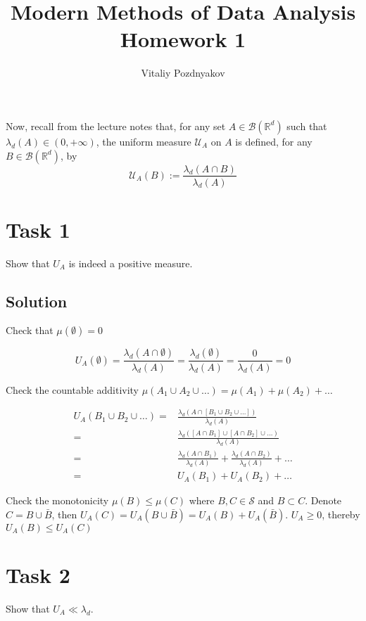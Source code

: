 \documentclass{article}
\title{Modern Methods of Data Analysis \\ Homework 1}
\author{Vitaliy Pozdnyakov}
\date{}
\begin{document}
\maketitle

Now, recall from the lecture notes that, for any set $A \in \mathcal B(\mathbb R^d)$ such that $\lambda_d(A) \in (0, +\infty)$, the uniform measure $\mathcal U_A$ on $A$ is defined, for any $B \in \mathcal B(\mathbb{R}^d )$, by 
$$\mathcal U_A(B):= \frac{\lambda_d(A \cap B)}{\lambda_d (A)}$$

\section*{Task 1}
Show that $U_A$ is indeed a positive measure.
\subsection*{Solution}

Check that $\mu(\emptyset) = 0$

$$U_A(\emptyset) = 
\frac{\lambda_d(A \cap \emptyset)}{\lambda_d(A)} = 
\frac{\lambda_d(\emptyset)}{\lambda_d(A)} = 
\frac{0}{\lambda_d(A)} = 0 $$

Check the countable additivity $\mu(A_1 \cup A_2 \cup \dots) = \mu(A_1) + \mu(A_2) + \dots$

\begin{equation*}
    \begin{aligned}
        U_A(B_1 \cup B_2 \cup \dots) = & \frac{\lambda_d(A \cap [B_1 \cup B_2 \cup \dots])}{\lambda_d(A)} \\ 
        = & \frac{\lambda_d([A \cap B_1] \cup [A \cap B_2] \cup \dots)}{\lambda_d(A)} \\
        = & \frac{\lambda_d(A \cap B_1)}{\lambda_d(A)} + \frac{\lambda_d(A \cap B_2)}{\lambda_d(A)} + \dots \\
        = & U_A(B_1) + U_A(B_2) + \dots
    \end{aligned}
\end{equation*}
        
Check the monotonicity $\mu(B) \leq \mu(C)$ where $B,C \in \mathcal{S}$ and $B \subset C$. Denote $C = B \cup \bar{B}$, then $U_A(C) = U_A(B \cup \bar B) = U_A(B) + U_A(\bar B)$. $ U_A \geq 0$, thereby $ U_A(B) \leq U_A(C)$

\section*{Task 2}
Show that $ U_A \ll \lambda_d$.
\end{document}
